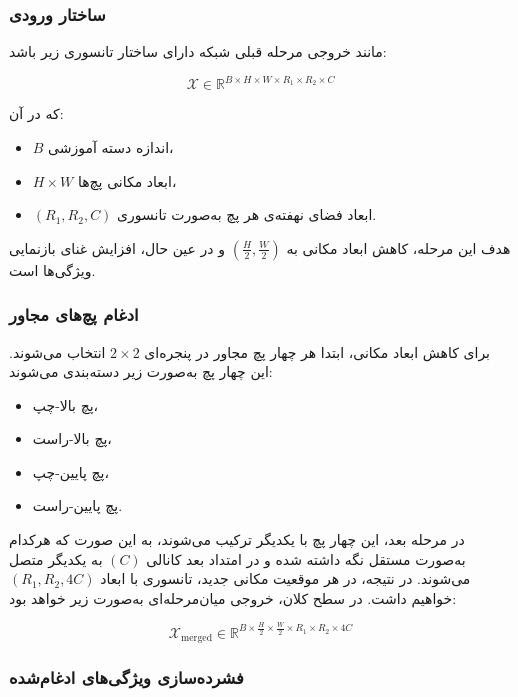 \subsubsection*{ساختار ورودی}

مانند  خروجی مرحله قبلی شبکه دارای ساختار تانسوری زیر باشد:

\[
\mathcal{X} \in \mathbb{R}^{B \times H \times W \times R_1 \times R_2 \times C}
\]

که در آن:

\begin{itemize}
	\item $B$ اندازه دسته آموزشی،  
	\item $H \times W$ ابعاد مکانی پچ‌ها،  
	\item $(R_1, R_2, C)$ ابعاد فضای نهفته‌ی هر پچ به‌صورت تانسوری.
\end{itemize}

هدف این مرحله، کاهش ابعاد مکانی به $\left( \frac{H}{2}, \frac{W}{2} \right)$ و در عین حال، افزایش غنای بازنمایی ویژگی‌ها است.

\subsubsection*{ادغام پچ‌های مجاور}

برای کاهش ابعاد مکانی، ابتدا هر چهار پچ مجاور در پنجره‌ای $2 \times 2$ انتخاب می‌شوند. این چهار پچ به‌صورت زیر دسته‌بندی می‌شوند:

\begin{itemize}
	\item پچ بالا-چپ،
	\item پچ بالا-راست،
	\item پچ پایین-چپ،
	\item پچ پایین-راست.
\end{itemize}

در مرحله بعد، این چهار پچ با یکدیگر ترکیب می‌شوند، به این صورت که هرکدام به‌صورت مستقل نگه داشته شده و در امتداد بعد کانالی $(C)$ به یکدیگر متصل می‌شوند. در نتیجه، در هر موقعیت مکانی جدید، تانسوری با ابعاد $(R_1, R_2, 4C)$ خواهیم داشت. در سطح کلان، خروجی میان‌مرحله‌ای به‌صورت زیر خواهد بود:

\[
\mathcal{X}_{\text{merged}} \in \mathbb{R}^{B \times \frac{H}{2} \times \frac{W}{2} \times R_1 \times R_2 \times 4C}
\]

\subsubsection*{فشرده‌سازی ویژگی‌های ادغام‌شده}


